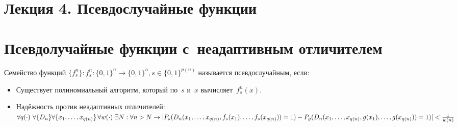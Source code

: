 \documentclass{article}
\begin{document}
\section*{Лекция 4. Псевдослучайные функции}
\resetcntrs

\section{Псевдолучайные функции с~неадаптивным отличителем}

\begin{definition}
	Семейство функций $\{f_s^n\}: f_s^n: \{0, 1\}^n \rightarrow \{0, 1\}^n, s \in
	\{0, 1\}^{p(n)}$ называется псевдослучайным, если:
	\begin{itemize}
		\item Существует полиномиальный алгоритм, который по~$s$ и~$x$
			вычисляет~$f_s^n(x)$.
		\item Надёжность против неадаптивных отличителей:\\
			$\forall q(\cdot)\ \forall\{D_n\} \forall\{x_1, \ldots, x_{q(n)}\}\,
			\forall w(\cdot)\ \exists N: \forall n > N \rightarrow\\
			|P_s(D_n(x_1, \ldots, x_{q(n)}, f_s(x_1), \ldots, f_s(x_{q(n)})) = 1) -\\
			P_g(D_n(x_1, \ldots, x_{q(n)}, g(x_1), \ldots, g(x_{q(n)})) = 1)| <
			\frac{1}{w(n)}$
	\end{itemize}
\end{definition}
\end{document}
